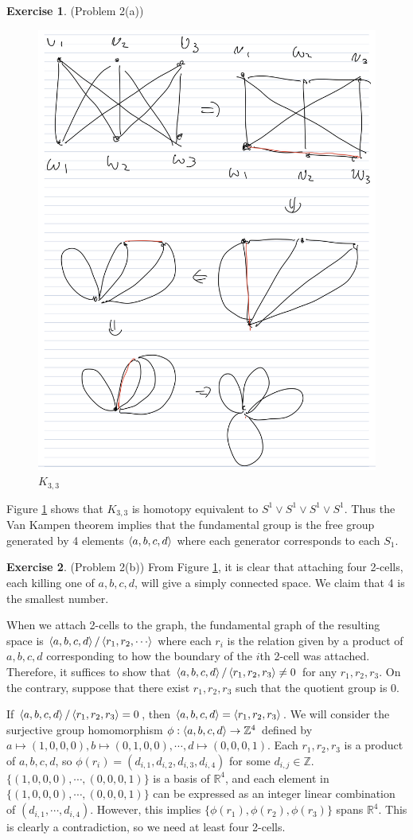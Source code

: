 \documentclass[12pt, psamsfonts]{amsart}
\theoremstyle{definition}
\newtheorem*{exer}{Exercise}
\theoremstyle{remark}
\numberwithin{equation}{section}
\begin{document}
\begin{exer}{(Problem 2(a))}
 \begin{figure}[!htb]
   \includegraphics[width=.5\linewidth]{k33.jpeg}
   \caption{$K_{3, 3}$}
   \label{fig:k33}
 \end{figure}
 Figure \ref{fig:k33} shows that $K_{3, 3}$ is homotopy equivalent to $S^1 \vee S^1 \vee S^1 \vee S^1$.
 Thus the Van Kampen theorem implies that the fundamental group is the free group generated by 4 elements $\ev{ a, b, c, d }$ where each generator corresponds to each $S_1$.
\end{exer}

\begin{exer}{(Problem 2(b))}
  From Figure \ref{fig:k33}, it is clear that attaching four 2-cells, each killing one of $a, b, c, d$, will give a simply connected space.
  We claim that 4 is the smallest number.

  When we attach 2-cells to the graph, the fundamental graph of the resulting space is $\ev{ a, b, c, d} / \ev{ r_1, r_2, \cdots }$ where each $r_i$ is the relation given by a product of $a, b, c, d$ corresponding to how the boundary of the $i$th 2-cell was attached.
  Therefore, it suffices to show that $\ev{a, b, c, d} / \ev{r_1, r_2, r_3} \ne 0$ for any $r_1, r_2, r_3$.
  On the contrary, suppose that there exist $r_1, r_2, r_3$ such that the quotient group is 0.
  
  If $\ev{a, b, c, d} / \ev{r_1, r_2, r_3} = 0$, then $\ev{a, b, c, d} = \ev{r_1, r_2, r_3}$.
  We will consider the surjective group homomorphism $\phi: \ev{a, b, c, d} \rightarrow \mathbb{Z}^4$ defined by $a \mapsto (1, 0, 0, 0), b \mapsto (0, 1, 0, 0), \cdots, d \mapsto (0, 0, 0, 1)$.
  Each $r_1, r_2, r_3$ is a product of $a, b, c, d$, so $\phi(r_i) = (d_{i, 1}, d_{i, 2}, d_{i, 3}, d_{i, 4})$ for some $d_{i, j} \in \mathbb{Z}$.
  $\{ (1, 0, 0, 0), \cdots, (0, 0, 0, 1) \}$ is a basis of $\mathbb{R}^4$, and each element in $\{ (1, 0, 0, 0), \cdots, (0, 0, 0, 1) \}$ can be expressed as an integer linear combination of $(d_{i, 1}, \cdots, d_{i, 4})$.
  However, this implies $\{ \phi(r_1), \phi(r_2), \phi(r_3) \}$ spans $\mathbb{R}^4$.
  This is clearly a contradiction, so we need at least four 2-cells.
\end{exer}
\end{document}
